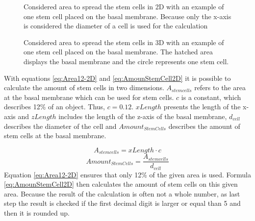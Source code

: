 \begin{figure}[ht]
\begin{center}
\caption[Considered area to spread the stem cells in two dimensions]{Considered area to spread the stem cells in 2D with an example of one stem cell placed on the basal membrane. Because only the x-axis is considered the diameter of a cell is used for the calculation}
\label{tikz:AreaIn2D}
\end{center}
\end{figure}


\begin{figure}[ht]
\begin{center}
\caption[Considered area to spread the stem cells in three dimensions]{Considered area to spread the stem cells in 3D with an example of one stem cell placed on the basal membrane. The hatched area displays the basal membrane and the circle represents one stem cell.}
\label{tikz:AreaIn3D}
\end{center}
\end{figure}


With equations \ref{eq:Area12-2D} and \ref{eq:AmounStemCell2D} it is possible to calculate the amount of stem cells in two dimensions. $A_{stem cells}$ refers to the area at the basal membrane which can be used for stem cells. $c$ is a constant, which describes 12\% of an object. Thus, $c=0.12$. $xLength$ presents the length of the x-axis and $zLength$ includes the length of the z-axis of the basal membrane, $d_{cell}$ describes the diameter of the cell and $Amount_{StemCells}$ describes the amount of stem cells at the basal membrane.

\begin{equation}\label{eq:Area12-2D}
A_{stem cells} = xLength \cdot c
\end{equation}
\begin{equation}\label{eq:AmounStemCell2D}
Amount_{StemCells} = \dfrac{A_{stem cells}}{d_{cell}} 
\end{equation}
Equation \ref{eq:Area12-2D} ensures that only 12\% of the given area is used. Formula \ref{eq:AmounStemCell2D} then calculates the amount of stem cells on this given area. Because the result of the calculation is often not a whole number, as last step the result is checked if the first decimal digit is larger or equal than 5 and then it is rounded up.

